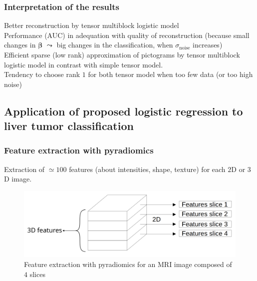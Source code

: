 \documentclass{beamer}
\begin{document}
\begin{frame}
    \frametitle{Interpretation of the results}
    Better reconstruction by tensor multiblock logistic model\\[10 pt]
    Performance (AUC) in adequation with quality of reconstruction (because small changes in $\bm{\beta}$ $\leadsto$ big changes in the classification, when $\sigma_{\text{noise}}$ increases)\\[10 pt]
    Efficient sparse (low rank) approximation of pictograms by tensor multiblock logistic model in contrast with simple tensor model.\\[10 pt]
    Tendency to choose rank $1$ for both tensor model when too few data (or too high noise)

\end{frame}

\begin{frame}
    \section{Application of proposed logistic regression to liver tumor classification}
\end{frame}

\begin{frame}
    \frametitle{Feature extraction with pyradiomics \cite{pyradio}}
    Extraction of $\simeq  100$ features (about intensities, shape, texture) for each $2$D or $3$D image.\\[10 pt]
    \begin{figure}
        \centering
        \includegraphics[scale = 0.15]{images/features.png}
        \caption{Feature extraction with pyradiomics for an MRI image composed of $4$ slices}
    \end{figure}
\end{frame}

\end{document}
